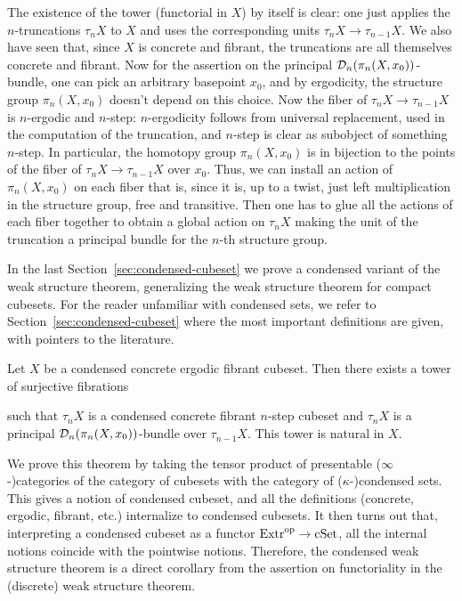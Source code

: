 The existence of the tower (functorial in $X$) by itself is clear:
one just applies the $n$-truncations $\tau_n X$ to $X$ and uses the corresponding units $\tau_n X\to\tau_{n-1}X$.
We also have seen that, since $X$ is concrete and fibrant, the truncations are all themselves concrete and fibrant.
Now for the assertion on the principal $\mathcal{D}_n(\pi_n(X,x_0))$-bundle,
one can pick an arbitrary basepoint $x_0$, and by ergodicity, the structure group $\pi_n(X,x_0)$
doesn't depend on this choice.
Now the fiber of $\tau_nX\to\tau_{n-1}X$ is $n$-ergodic and $n$-step:
$n$-ergodicity follows from universal replacement, used in the computation of the truncation,
and $n$-step is clear as subobject of something $n$-step.
In particular, the homotopy group $\pi_n(X,x_0)$ is in bijection to the points of the fiber of $\tau_nX\to\tau_{n-1}X$ over $x_0$.
Thus, we can install an action of $\pi_n(X,x_0)$ on each fiber that is,
since it is, up to a twist, just left multiplication in the structure group,
free and transitive.
Then one has to glue all the actions of each fiber together to obtain a global action on $\tau_n X$
making the unit of the truncation a principal bundle for the $n$-th structure group.

In the last Section~\ref{sec:condensed-cubeset} we prove a condensed variant of the weak structure theorem, generalizing the weak structure theorem for compact cubesets.
For the reader unfamiliar with condensed sets, we refer to Section~\ref{sec:condensed-cubeset}
where the most important definitions are given, with pointers to the literature.

\begin{theorem*}
Let $X$ be a condensed concrete ergodic fibrant cubeset.
Then there exists a tower of surjective fibrations
\begin{center}
\end{center}
such that $\tau_n X$ is a condensed concrete fibrant $n$-step cubeset
and $\tau_n X$ is a principal $\mathcal{D}_n(\pi_n(X,x_0))$-bundle over $\tau_{n-1} X$.
This tower is natural in $X$.
\end{theorem*}

We prove this theorem by taking the tensor product of presentable ($\infty$-)categories
of the category of cubesets with the category of ($\kappa$-)condensed sets.
This gives a notion of condensed cubeset, and all the definitions (concrete, ergodic, fibrant, etc.)
internalize to condensed cubesets.
It then turns out that, interpreting a condensed cubeset as a functor $\mathrm{Extr}^{\mathrm{op}}\to\mathrm{cSet}$,
all the internal notions coincide with the pointwise notions.
Therefore, the condensed weak structure theorem is a direct corollary from the assertion on
functoriality in the (discrete) weak structure theorem.

